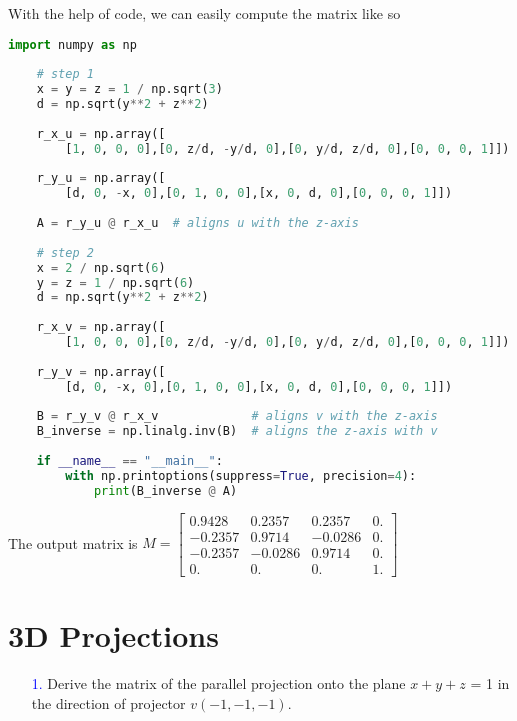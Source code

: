 \documentclass[11pt]{article}  %
\begin{document}
    With the help of code, we can easily compute the matrix like so\\
    \begin{lstlisting}[language=python,numbers=none]
    import numpy as np
    
    # step 1
    x = y = z = 1 / np.sqrt(3)
    d = np.sqrt(y**2 + z**2)
    
    r_x_u = np.array([
        [1, 0, 0, 0],[0, z/d, -y/d, 0],[0, y/d, z/d, 0],[0, 0, 0, 1]])
    
    r_y_u = np.array([
        [d, 0, -x, 0],[0, 1, 0, 0],[x, 0, d, 0],[0, 0, 0, 1]])
    
    A = r_y_u @ r_x_u  # aligns u with the z-axis
    
    # step 2
    x = 2 / np.sqrt(6)
    y = z = 1 / np.sqrt(6)
    d = np.sqrt(y**2 + z**2)
    
    r_x_v = np.array([
        [1, 0, 0, 0],[0, z/d, -y/d, 0],[0, y/d, z/d, 0],[0, 0, 0, 1]])
    
    r_y_v = np.array([
        [d, 0, -x, 0],[0, 1, 0, 0],[x, 0, d, 0],[0, 0, 0, 1]])
    
    B = r_y_v @ r_x_v             # aligns v with the z-axis
    B_inverse = np.linalg.inv(B)  # aligns the z-axis with v
    
    if __name__ == "__main__":
        with np.printoptions(suppress=True, precision=4):
            print(B_inverse @ A)
    \end{lstlisting}
    
    The output matrix is
    $M = \begin{bmatrix}
    0.9428 &  0.2357 &  0.2357 &  0.\\
    -0.2357 &  0.9714 & -0.0286 &  0.\\
    -0.2357 & -0.0286 &  0.9714 &  0.\\
    0.     &  0.     &  0.     &  1.
    \end{bmatrix}$\\

\section{3D Projections}
    \begin{enumerate}[leftmargin=*]
        \item[\textcolor{blue}{1.}] Derive the matrix of the parallel projection onto the plane $x + y + z$ = 1 in the direction of projector $v(-1,-1,-1)$.
    \end{enumerate}
    
\end{document}
